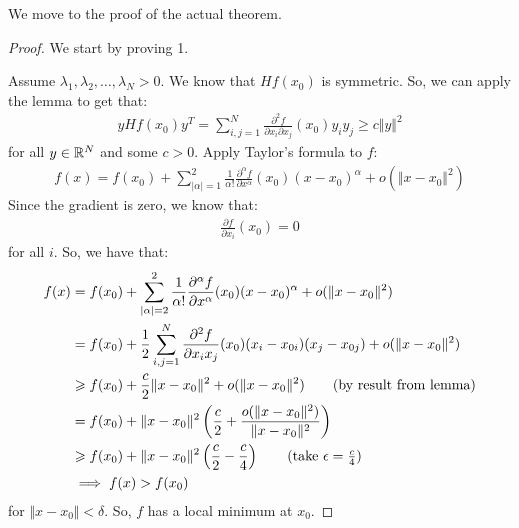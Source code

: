 \documentclass{report}
\begin{document}
\noindent We move to the proof of the actual theorem.
\begin{proof}
    We start by proving 1.

    \noindent Assume $\lambda_1, \lambda_2, \ldots, \lambda_N > 0$. We know that $Hf(x_0)$ is symmetric. So, we can apply the lemma to get that:
    \begin{align*}
        y Hf(x_0) y^T =\sum_{i, j=1}^N \frac{\partial^2 f}{\partial x_i \partial x_j}(x_0)y_iy_j \geq c \Vert y \Vert^2
    \end{align*}
    for all $y \in \RR^N$ and some $c > 0$. Apply Taylor's formula to $f$:
    \begin{align*}
        f(x) = f(x_0) + \sum_{|\alpha| = 1}^2 \frac{1}{\alpha !}\frac{\partial^\alpha f}{\partial x^\alpha}(x_0)(x-x_0)^\alpha + o(\Vert x - x_0 \Vert^2)
    \end{align*}
    Since the gradient is zero, we know that:
    \begin{align*}
        \frac{\partial f}{\partial x_i}(x_0) = 0
    \end{align*}
    for all $i$. So, we have that:
    \begin{align*}
        f(x) &= f(x_0) + \sum_{|\alpha| = 2}^2 \frac{1}{\alpha !}\frac{\partial^\alpha f}{\partial x^\alpha}(x_0)(x-x_0)^\alpha + o(\Vert x - x_0 \Vert^2) \\
        &= f(x_0) + \frac{1}{2}\sum_{i , j = 1}^N \frac{\partial^2f}{\partial x_i x_j}(x_0)(x_i - x_{0i})(x_j - x_{0j}) + o(\Vert x - x_0 \Vert^2) \\
        &\geq f(x_0) + \frac{c}{2}\Vert x - x_0 \Vert^2 + o(\Vert x - x_0 \Vert^2) \tag{by result from lemma}\\
        &= f(x_0) + \Vert x - x_0 \Vert^2 \left( \frac{c}{2} + \frac{o(\Vert x - x_0 \Vert^2)}{\Vert x -x_0 \Vert^2} \right) \\
        &\geq f(x_0) + \Vert x - x_0 \Vert^2 \left( \frac{c}{2} - \frac{c}{4}\right) \tag{take $\epsilon = \frac{c}{4}$} \\
        &\implies f(x) > f(x_0)
    \end{align*}
    for $\Vert x - x_0 \Vert < \delta$. So, $f$ has a local minimum at $x_0$.


\end{proof}
\end{document}
